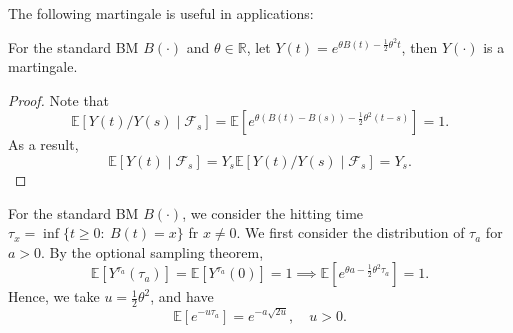 The following martingale is useful in applications:
\begin{proposition}
For the standard BM $B(\cdot)$ and $\theta\in\mathbb{R}$, let $Y(t)=e^{\theta B(t) - \frac{1}{2}\theta^2t}$, then $Y(\cdot)$ is a martingale.
\end{proposition}

\begin{proof}
Note that 
\[
\mathbb{E}[Y(t)/Y(s)\mid\mathcal{F}_s]=\mathbb{E}[e^{\theta(B(t) - B(s)) - \frac{1}{2}\theta^2(t-s)}]=1.
\]
As a result,
\[
\mathbb{E}[Y(t)\mid\mathcal{F}_s] = Y_s\mathbb{E}[Y(t)/Y(s)\mid\mathcal{F}_s]=Y_s.
\]
\end{proof}

For the standard BM $B(\cdot)$, we consider the hitting time $\tau_x=\inf\{t\ge0:~B(t)=x\}$ fr $x\ne0$.
We first consider the distribution of $\tau_a$ for $a>0$.
By the optional sampling theorem,
\[
\mathbb{E}[Y^{\tau_a}(\tau_a)]=\mathbb{E}[Y^{\tau_a}(0)]=1
\implies
\mathbb{E}[e^{\theta a-\frac{1}{2}\theta^2\tau_a}]=1.
\]
Hence, we take $u=\frac{1}{2}\theta^2$, and have
\[
\mathbb{E}[e^{-u\tau_a}]=e^{-a\sqrt{2u}},\quad u>0.
\]

